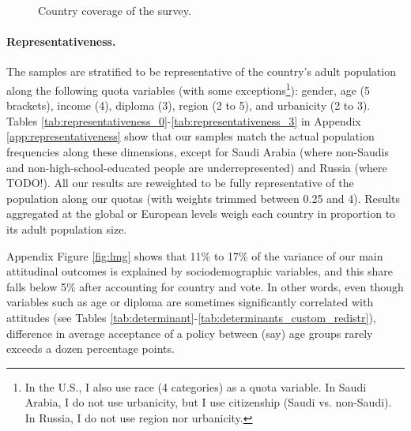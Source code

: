 \documentclass[12pt,english]{article}
\begin{document}
\begin{bibunit}
\begin{figure}[h!]
    \caption[Country coverage]{Country coverage of the survey.
    }\label{fig:country_coverage}
\end{figure}

\paragraph{Representativeness.}
The samples are stratified to be representative of the country's adult population along the following quota variables (with some exceptions\footnote{In the U.S., I also use race (4 categories) as a quota variable. In Saudi Arabia, I do not use urbanicity, but I use citizenship (Saudi vs. non-Saudi). In Russia, I do not use region nor urbanicity.}): gender, age (5 brackets), income (4), diploma (3), region (2 to 5), and urbanicity (2 to 3). Tables \ref{tab:representativeness_0}-\ref{tab:representativeness_3} in Appendix \ref{app:representativeness} show that our samples match the actual population frequencies along these dimensions, except for Saudi Arabia (where non-Saudis and non-high-school-educated people are underrepresented) and Russia (where TODO!). All our results are reweighted to be fully representative of the population along our quotas (with weights trimmed between 0.25 and 4). Results aggregated at the global or European levels weigh each country in proportion to its adult population size. 

Appendix Figure \ref{fig:lmg} shows that 11\% to 17\% of the variance of our main attitudinal outcomes is explained by sociodemographic variables, and this share falls below 5\% after accounting for country and vote. In other words, even though variables such as age or diploma are sometimes significantly correlated with attitudes (see Tables \ref{tab:determinant}-\ref{tab:determinants_custom_redistr}), difference in average acceptance of a policy between (say) age groups rarely exceeds a dozen percentage points. %


\end{bibunit}
\end{document}
